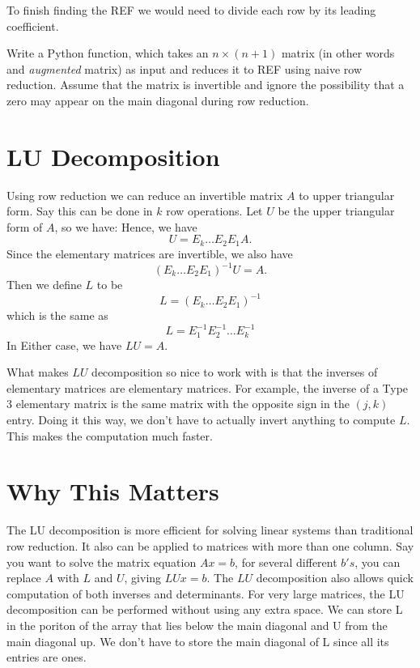 To finish finding the REF we would need to divide each row by its leading coefficient.

\begin{problem}
\label{prob:REF}
Write a Python function, which takes an $n\times (n+1)$ matrix (in other words and \emph{augmented} matrix) as input and reduces it to REF using naive row reduction.
Assume that the matrix is invertible and ignore the possibility that a zero may appear on the main diagonal during row reduction.
\end{problem}

\section*{LU Decomposition}

Using row reduction we can reduce an invertible matrix $A$ to upper triangular form.
Say this can be done in $k$ row operations.
Let $U$ be the upper triangular form of $A$, so we have:
Hence, we have
\[
U = E_k \dots E_2 E_1 A.
\]
Since the elementary matrices are invertible, we also have
\[
(E_k \dots E_2 E_1)^{-1} U =  A.
\]
Then we define $L$ to be
\[
L = (E_k \dots E_2 E_1)^{-1}
\]
which is the same as
\[
L = E_1^{-1} E_2^{-1} \dots E_k^{-1}
\]
In Either case, we have $L U = A$.

What makes $LU$ decomposition so nice to work with is that the inverses of elementary matrices are elementary matrices.
For example, the inverse of a Type 3 elementary matrix is the same matrix with the opposite sign in the $(j,k)$ entry.
Doing it this way, we don't have to actually invert anything to compute $L$.
This makes the computation much faster.

\section*{Why This Matters}

The LU decomposition is more efficient for solving linear systems than traditional row reduction.
It also can be applied to matrices with more than one column.
Say you want to solve the matrix equation $A x = b$, for several different $b's$, you can replace $A$ with $L$ and $U$, giving $L U x = b$.
The $LU$ decomposition also allows quick computation of both inverses and determinants.
For very large matrices, the LU decomposition can be performed without using any extra space.
We can store L in the poriton of the array that lies below the main diagonal and U from the main diagonal up.
We don't have to store the main diagonal of L since all its entries are ones.


